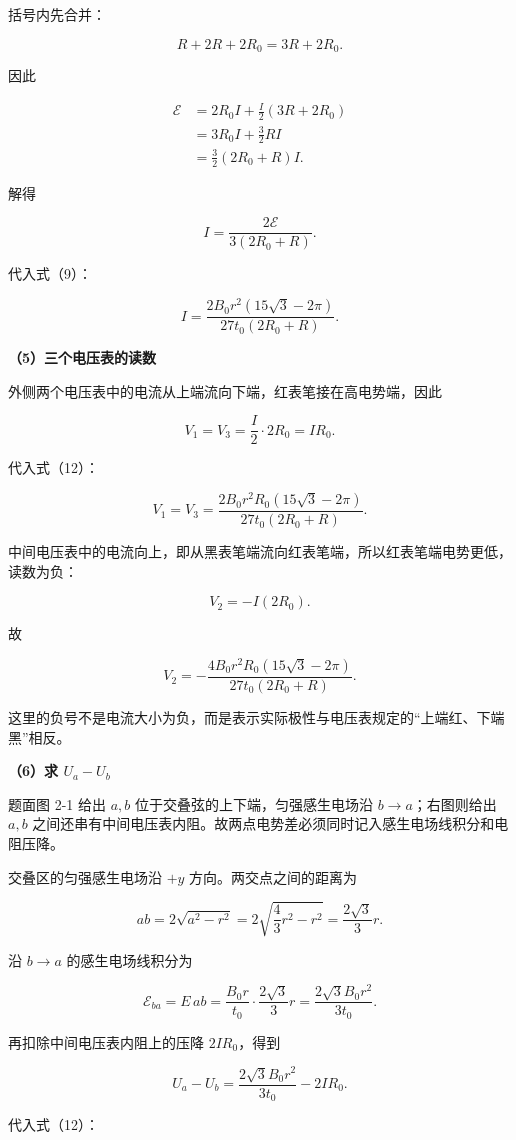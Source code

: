 \documentclass[12pt,a4paper,UTF8]{ctexart}
\begin{document}
括号内先合并：

\[
R+2R+2R_0=3R+2R_0.
\]

因此

\[
\begin{aligned}
\mathcal E
&=2R_0I+\frac I2(3R+2R_0)\\
&=3R_0I+\frac32RI\\
&=\frac32(2R_0+R)I.
\end{aligned}
\]

解得

\[
\boxed{I=\frac{2\mathcal E}{3(2R_0+R)}}.
\tag{11}
\]

代入式（9）：

\[
I=\frac{2B_0r^2(15\sqrt3-2\pi)}{27t_0(2R_0+R)}.
\tag{12}
\]

\textbf{（5）三个电压表的读数}

外侧两个电压表中的电流从上端流向下端，红表笔接在高电势端，因此

\[
V_1=V_3=\frac I2\cdot2R_0=IR_0.
\]

代入式（12）：

\[
\boxed{
V_1=V_3=
\frac{2B_0r^2R_0(15\sqrt3-2\pi)}
{27t_0(2R_0+R)}
}.
\tag{13}
\]

中间电压表中的电流向上，即从黑表笔端流向红表笔端，所以红表笔端电势更低，读数为负：

\[
V_2=-I(2R_0).
\]

故

\[
\boxed{
V_2=-\frac{4B_0r^2R_0(15\sqrt3-2\pi)}
{27t_0(2R_0+R)}
}.
\tag{14}
\]

这里的负号不是电流大小为负，而是表示实际极性与电压表规定的``上端红、下端黑''相反。

\textbf{（6）求 \(U_a-U_b\)}

题面图 2-1 给出 \(a,b\) 位于交叠弦的上下端，匀强感生电场沿
\(b\to a\)；右图则给出 \(a,b\)
之间还串有中间电压表内阻。故两点电势差必须同时记入感生电场线积分和电阻压降。

交叠区的匀强感生电场沿 \(+y\) 方向。两交点之间的距离为

\[
ab=2\sqrt{a^2-r^2}
=2\sqrt{\frac43r^2-r^2}
=\frac{2\sqrt3}{3}r.
\tag{15}
\]

沿 \(b\to a\) 的感生电场线积分为

\[
\mathcal E_{ba}=E\,ab
=\frac{B_0r}{t_0}\cdot\frac{2\sqrt3}{3}r
=\frac{2\sqrt3B_0r^2}{3t_0}.
\tag{16}
\]

再扣除中间电压表内阻上的压降 \(2IR_0\)，得到

\[
U_a-U_b=\frac{2\sqrt3B_0r^2}{3t_0}-2IR_0.
\]

代入式（12）：
\end{document}
